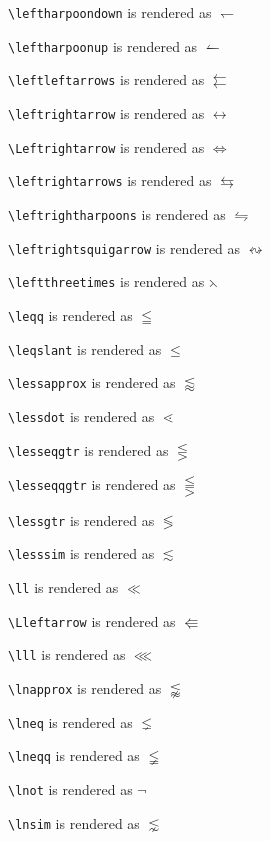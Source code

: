 \texttt{\textbackslash leftharpoondown} is rendered as $\leftharpoondown$


\texttt{\textbackslash leftharpoonup} is rendered as $\leftharpoonup$


\texttt{\textbackslash leftleftarrows} is rendered as $\leftleftarrows$


\texttt{\textbackslash leftrightarrow} is rendered as $\leftrightarrow$


\texttt{\textbackslash Leftrightarrow} is rendered as $\Leftrightarrow$


\texttt{\textbackslash leftrightarrows} is rendered as $\leftrightarrows$


\texttt{\textbackslash leftrightharpoons} is rendered as $\leftrightharpoons$


\texttt{\textbackslash leftrightsquigarrow} is rendered as $\leftrightsquigarrow$


\texttt{\textbackslash leftthreetimes} is rendered as $\leftthreetimes$


\texttt{\textbackslash leqq} is rendered as $\leqq$


\texttt{\textbackslash leqslant} is rendered as $\leqslant$


\texttt{\textbackslash lessapprox} is rendered as $\lessapprox$


\texttt{\textbackslash lessdot} is rendered as $\lessdot$


\texttt{\textbackslash lesseqgtr} is rendered as $\lesseqgtr$


\texttt{\textbackslash lesseqqgtr} is rendered as $\lesseqqgtr$


\texttt{\textbackslash lessgtr} is rendered as $\lessgtr$


\texttt{\textbackslash lesssim} is rendered as $\lesssim$


\texttt{\textbackslash ll} is rendered as $\ll$


\texttt{\textbackslash Lleftarrow} is rendered as $\Lleftarrow$


\texttt{\textbackslash lll} is rendered as $\lll$


\texttt{\textbackslash lnapprox} is rendered as $\lnapprox$


\texttt{\textbackslash lneq} is rendered as $\lneq$


\texttt{\textbackslash lneqq} is rendered as $\lneqq$


\texttt{\textbackslash lnot} is rendered as $\lnot$


\texttt{\textbackslash lnsim} is rendered as $\lnsim$


